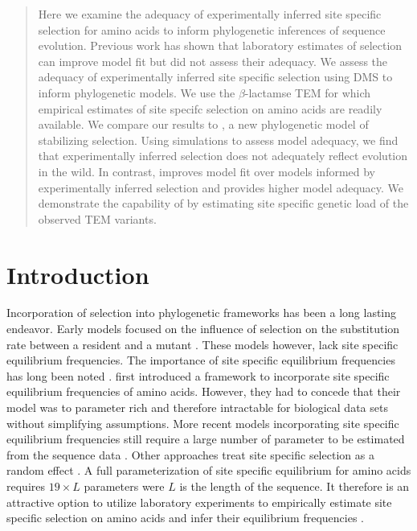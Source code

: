 \documentclass[12pt]{article}
\begin{document}
\begin{abstract}
Here we examine the adequacy of experimentally inferred site specific selection for amino acids to inform phylogenetic inferences of sequence evolution.
Previous work has shown that laboratory estimates of selection can improve model fit but did not assess their adequacy.
We assess the adequacy of experimentally inferred site specific selection using DMS to inform phylogenetic models.
We use the $\beta$-lactamse TEM for which empirical estimates of site specifc selection on amino acids are readily available.
We compare our results to \selac, a new phylogenetic model of stabilizing selection.
Using simulations to assess model adequacy, we find that experimentally inferred selection does not adequately reflect evolution in the wild.
In contrast, \selac improves model fit over models informed by experimentally inferred selection and provides higher model adequacy.
We demonstrate the capability of \selac by estimating site specific genetic load of the observed TEM variants.

\end{abstract}
\newpage

\section*{Introduction}

Incorporation of selection into phylogenetic frameworks has been a long lasting endeavor.
Early models focused on the influence of selection on the substitution rate between a resident and a mutant \citep{GoldmanAndYang1994, MuseAndGaut1994, thorne1996}.
These models however, lack site specific equilibrium frequencies.
The importance of site specific equilibrium frequencies has long been noted \citep{felsenstein1981, gojobori1983}.
\citet{HalpernAndBruno1998} first introduced a framework to incorporate site specific equilibrium frequencies of amino acids.
However, they had to concede that their model was to parameter rich and therefore intractable for biological data sets without simplifying assumptions.
More recent models incorporating site specific equilibrium frequencies still require a large number of parameter to be estimated from the sequence data \citep{LartillotAndPhilippe2004,le2008,wang2008,holder2008,wu2013,tamuri2014}.
Other approaches treat site specific selection as a random effect \citep{rodrigue2010,rodrigue2013,rodrigue2014}.
A full parameterization of site specific equilibrium for amino acids requires $19\times L$ parameters were $L$ is the length of the sequence.
It therefore is an attractive option to utilize laboratory experiments to empirically estimate site specific selection on amino acids and infer their equilibrium frequencies \citep{bloom2014, thyagarajan2014, bloom2017}.
\end{document}
